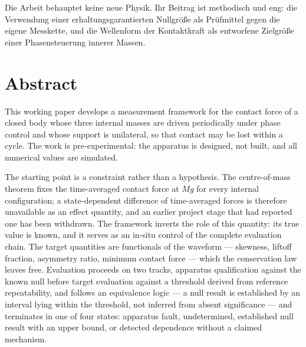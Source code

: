 \documentclass[12pt,a4paper]{report}
\begin{document}
Die Arbeit behauptet keine neue Physik. Ihr Beitrag ist methodisch und
eng: die Verwendung einer erhaltungsgarantierten Nullgröße als Prüfmittel
gegen die eigene Messkette, und die Wellenform der Kontaktkraft als
entworfene Zielgröße einer Phasensteuerung innerer Massen.

\clearpage

\chapter*{Abstract}

This working paper develops a measurement framework for the contact force of a
closed body whose three internal masses are driven periodically under
phase control and whose support is unilateral, so that contact may be
lost within a cycle. The work is pre-experimental: the apparatus is
designed, not built, and all numerical values are simulated.

The starting point is a constraint rather than a hypothesis. The
centre-of-mass theorem fixes the time-averaged contact force at $Mg$ for
every internal configuration; a state-dependent difference of
time-averaged forces is therefore unavailable as an effect quantity, and
an earlier project stage that had reported one has been withdrawn. The
framework inverts the role of this quantity: its true value is known,
and it serves as an in-situ control of the complete evaluation chain.
The target quantities are functionals of the waveform --- skewness,
liftoff fraction, asymmetry ratio, minimum contact force --- which the
conservation law leaves free. Evaluation proceeds on two tracks,
apparatus qualification against the known null before target evaluation
against a threshold derived from reference repeatability, and
follows an equivalence logic --- a null result is established by an
interval lying within the threshold, not inferred from absent
significance --- and terminates in one of four states: apparatus fault,
undetermined, established null result with an upper bound, or detected
dependence without a claimed mechanism.
\end{document}
